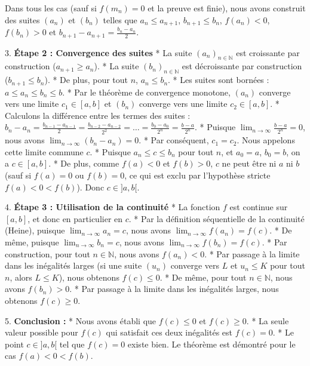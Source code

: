 \documentclass[12pt,a4paper]{report}
\begin{document}
    Dans tous les cas (sauf si $f(m_n)=0$ et la preuve est finie), nous avons construit des suites $(a_n)$ et $(b_n)$ telles que $a_n \le a_{n+1}$, $b_{n+1} \le b_n$, $f(a_n) < 0$, $f(b_n) > 0$ et $b_{n+1} - a_{n+1} = \frac{b_n - a_n}{2}$.

3.  \textbf{Étape 2 : Convergence des suites}
    *   La suite $(a_n)_{n \in \mathbb{N}}$ est croissante par construction ($a_{n+1} \ge a_n$).
    *   La suite $(b_n)_{n \in \mathbb{N}}$ est décroissante par construction ($b_{n+1} \le b_n$).
    *   De plus, pour tout $n$, $a_n \le b_n$.
    *   Les suites sont bornées : $a \le a_n \le b_n \le b$.
    *   Par le théorème de convergence monotone, $(a_n)$ converge vers une limite $c_1 \in [a, b]$ et $(b_n)$ converge vers une limite $c_2 \in [a, b]$.
    *   Calculons la différence entre les termes des suites :
        $b_n - a_n = \frac{b_{n-1} - a_{n-1}}{2} = \frac{b_{n-2} - a_{n-2}}{2^2} = \dots = \frac{b_0 - a_0}{2^n} = \frac{b - a}{2^n}$.
    *   Puisque $\lim_{n \to \infty} \frac{b - a}{2^n} = 0$, nous avons $\lim_{n \to \infty} (b_n - a_n) = 0$.
    *   Par conséquent, $c_1 = c_2$. Nous appelons cette limite commune $c$.
    *   Puisque $a_n \le c \le b_n$ pour tout $n$, et $a_0 = a$, $b_0 = b$, on a $c \in [a, b]$.
    *   De plus, comme $f(a) < 0$ et $f(b) > 0$, $c$ ne peut être ni $a$ ni $b$ (sauf si $f(a)=0$ ou $f(b)=0$, ce qui est exclu par l'hypothèse stricte $f(a)<0<f(b)$). Donc $c \in ]a, b[$.

4.  \textbf{Étape 3 : Utilisation de la continuité}
    *   La fonction $f$ est continue sur $[a, b]$, et donc en particulier en $c$.
    *   Par la définition séquentielle de la continuité (Heine), puisque $\lim_{n \to \infty} a_n = c$, nous avons $\lim_{n \to \infty} f(a_n) = f(c)$.
    *   De même, puisque $\lim_{n \to \infty} b_n = c$, nous avons $\lim_{n \to \infty} f(b_n) = f(c)$.
    *   Par construction, pour tout $n \in \mathbb{N}$, nous avons $f(a_n) < 0$.
    *   Par passage à la limite dans les inégalités larges (si une suite $(u_n)$ converge vers $L$ et $u_n \le K$ pour tout $n$, alors $L \le K$), nous obtenons $f(c) \le 0$.
    *   De même, pour tout $n \in \mathbb{N}$, nous avons $f(b_n) > 0$.
    *   Par passage à la limite dans les inégalités larges, nous obtenons $f(c) \ge 0$.

5.  \textbf{Conclusion :}
    *   Nous avons établi que $f(c) \le 0$ et $f(c) \ge 0$.
    *   La seule valeur possible pour $f(c)$ qui satisfait ces deux inégalités est $f(c) = 0$.
    *   Le point $c \in ]a, b[$ tel que $f(c) = 0$ existe bien. Le théorème est démontré pour le cas $f(a) < 0 < f(b)$.
\end{document}
